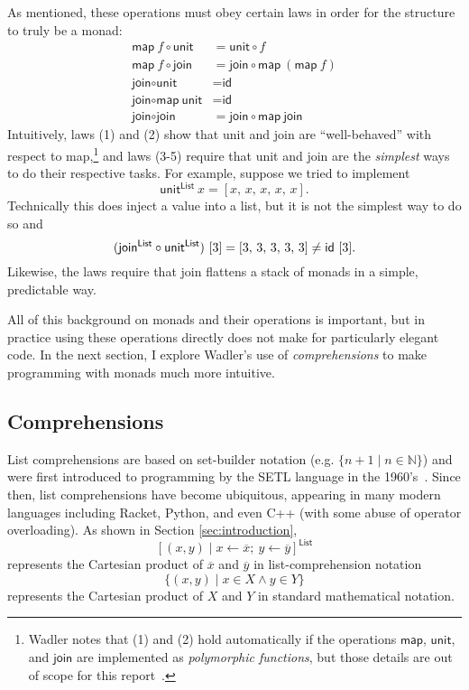 \documentclass[acmsmall, nonacm, screen]{acmart}
\newcommand{\unit}[2]{\textsf{unit}^{\textsf{#1}}~#2}
\begin{document}
As mentioned, these operations must obey certain laws in order for the structure to truly be a
monad:
\begin{align}
  \textsf{map}~f \circ \textsf{unit} &= \textsf{unit} \circ f \\
  \textsf{map}~f \circ \textsf{join} &= \textsf{join} \circ \textsf{map}~(\textsf{map}~f) \\
  \textsf{join} \circ \textsf{unit} &= \textsf{id} \\
  \textsf{join} \circ \textsf{map}~\textsf{unit} &= \textsf{id} \\
  \textsf{join} \circ \textsf{join} &= \textsf{join} \circ \textsf{map}~\textsf{join}
\end{align}
Intuitively, laws (1) and (2) show that \textsf{unit} and \textsf{join} are ``well-behaved'' with
respect to \textsf{map},\footnote{Wadler notes that (1) and (2) hold automatically if the
operations $\textsf{map}$, $\textsf{unit}$, and $\textsf{join}$ are implemented as {\em
polymorphic functions}, but those details are out of scope for this
report~\cite{wadler1989theorems}.} and laws (3-5) require that \textsf{unit} and \textsf{join}
are the {\em simplest} ways to do their respective tasks. For example, suppose we tried to implement
\[ \unit{List}{x} = [x,\, x,\, x,\, x,\, x]. \]
Technically this does inject a value into a list, but it is not the simplest way to do so and
\[
  (\textsf{join}^{\textsf{List}} \circ \textsf{unit}^{\textsf{List}})~[3] = [3,\, 3,\, 3,\, 3,\, 3] \neq \textsf{id}~[3]. \\
\]
Likewise, the laws require that \textsf{join} flattens a stack of monads in a simple, predictable
way.

All of this background on monads and their operations is important, but in practice using these
operations directly does not make for particularly elegant code. In the next section, I explore
Wadler's use of {\em comprehensions} to make programming with monads much more intuitive.

\subsection{Comprehensions}

List comprehensions are based on set-builder notation (e.g. $\{n + 1 \mid n \in \mathbb{N}\}$)
and were first introduced to programming by the SETL language in the
1960's~\cite{schwartz2012programming}. Since then, list comprehensions have become ubiquitous,
appearing in many modern languages including Racket, Python, and even C++ (with some abuse of
operator overloading). As shown in Section \ref{sec:introduction},
\[ [(x, y) \mid x \leftarrow \overline{x};\ y \leftarrow \overline{y}]^{\textsf{List}} \]
represents the Cartesian product of $\overline{x}$ and $\overline{y}$ in list-comprehension notation
\[ \{(x, y) \mid x \in X \wedge y \in Y\} \]
represents the Cartesian product of $X$ and $Y$ in standard mathematical notation.
\end{document}
